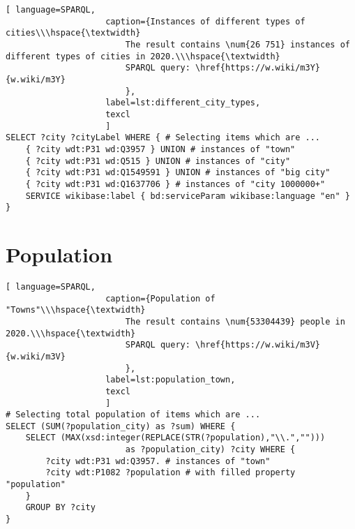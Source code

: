 \begin{lstlisting}[ language=SPARQL, 
                    caption={Instances of different types of cities\\\hspace{\textwidth}
                        The result contains \num{26 751} instances of different types of cities in 2020.\\\hspace{\textwidth}
                        SPARQL query: \href{https://w.wiki/m3Y}{w.wiki/m3Y}
                        },
                    label=lst:different_city_types,
                    texcl 
                    ]
SELECT ?city ?cityLabel WHERE { # Selecting items which are ...
	{ ?city wdt:P31 wd:Q3957 } UNION # instances of "town"
	{ ?city wdt:P31 wd:Q515 } UNION # instances of "city"
	{ ?city wdt:P31 wd:Q1549591 } UNION # instances of "big city"
	{ ?city wdt:P31 wd:Q1637706 } # instances of "city 1000000+"                                
	SERVICE wikibase:label { bd:serviceParam wikibase:language "en" }
}
\end{lstlisting}%

\section{Population}

\begin{lstlisting}[ language=SPARQL, 
                    caption={Population of "Towns"\\\hspace{\textwidth}
                        The result contains \num{53304439} people in 2020.\\\hspace{\textwidth}
                        SPARQL query: \href{https://w.wiki/m3V}{w.wiki/m3V}
                        },
                    label=lst:population_town,
                    texcl 
                    ]
# Selecting total population of items which are ...
SELECT (SUM(?population_city) as ?sum) WHERE {                    
	SELECT (MAX(xsd:integer(REPLACE(STR(?population),"\\.",""))) 
						as ?population_city) ?city WHERE {
		?city wdt:P31 wd:Q3957.	# instances of "town"
		?city wdt:P1082 ?population # with filled property "population"                                  
	}
	GROUP BY ?city
}
\end{lstlisting}%

